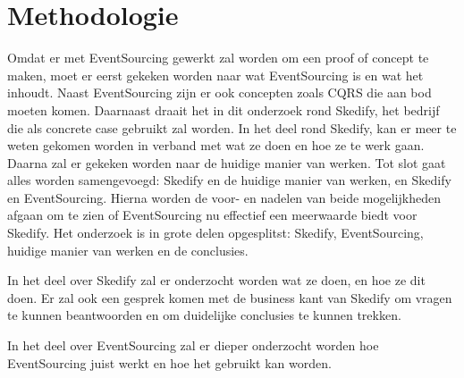 
\chapter{Methodologie}
\label{ch:methodologie}



Omdat er met EventSourcing gewerkt zal worden om een proof of concept te maken, moet er eerst gekeken worden naar wat EventSourcing is en wat het inhoudt. Naast EventSourcing zijn er ook concepten zoals CQRS die aan bod moeten komen. Daarnaast draait het in dit onderzoek rond Skedify, het bedrijf die als concrete case gebruikt zal worden. In het deel rond Skedify, kan er meer te weten gekomen worden in verband met wat ze doen en hoe ze te werk gaan. Daarna zal er gekeken worden naar de huidige manier van werken. Tot slot gaat alles worden samengevoegd: Skedify en de huidige manier van werken, en Skedify en EventSourcing. Hierna worden de voor- en nadelen van beide mogelijkheden afgaan om te zien of EventSourcing nu effectief een meerwaarde biedt voor Skedify. Het onderzoek is in grote delen opgesplitst: Skedify, EventSourcing, huidige manier van werken en de conclusies.

In het deel over Skedify zal er onderzocht worden wat ze doen, en hoe ze dit doen. Er zal ook een gesprek komen met de business kant van Skedify om vragen te kunnen beantwoorden en om duidelijke conclusies te kunnen trekken.

In het deel over EventSourcing zal er dieper onderzocht worden hoe EventSourcing juist werkt en hoe het gebruikt kan worden.
